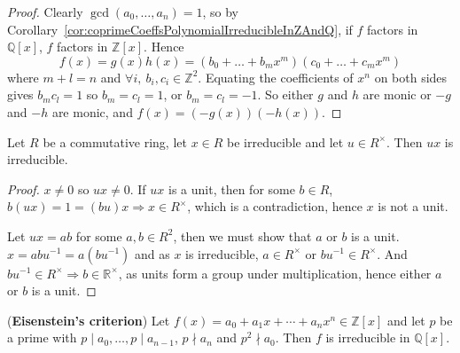 \begin{proof}
	Clearly $\gcd(a_0, \dots, a_n) = 1$, so by Corollary~\ref{cor:coprimeCoeffsPolynomialIrreducibleInZAndQ}, if $f$ factors in $\mathbb{Q}[x]$, $f$ factors in $\mathbb{Z}[x]$. Hence
	\[
		f(x) = g(x) h(x) = (b_0 + \dots + b_m x^m) (c_0 + \dots + c_m x^m)
	\]
	where $m + l = n$ and $\forall i, \ b_i, c_i \in \mathbb{Z}^2$. Equating the coefficients of $x^n$ on both sides gives $b_m c_l = 1$ so $b_m = c_l = 1$, or $b_m = c_l = -1$. So either $g$ and $h$ are monic or $-g$ and $-h$ are monic, and $f(x) = (-g(x)) (-h(x))$.
\end{proof}

\begin{lemma}\label{lem:irreducibleTimesUnitIsIrreducible}
	Let $R$ be a commutative ring, let $x \in R$ be irreducible and let $u \in R^{\times}$. Then $ux$ is irreducible.
\end{lemma}

\begin{proof}
	$x \ne 0$ so $ux \ne 0$. If $ux$ is a unit, then for some $b \in R$, $b (ux) = 1 = (bu) x \Longrightarrow x \in R^{\times}$, which is a contradiction, hence $x$ is not a unit.

	Let $ux = ab$ for some $a, b \in R^2$, then we must show that $a$ or $b$ is a unit. $x = ab u^{-1} = a(b u^{-1})$ and as $x$ is irreducible, $a \in R^{\times}$ or $b u^{-1} \in R^{\times}$. And $b u^{-1} \in R^{\times} \Rightarrow b \in \mathbb{R}^{\times}$, as units form a group under multiplication, hence either $a$ or $b$ is a unit.
\end{proof}

\begin{proposition}
	(\textbf{Eisenstein's criterion}) Let $f(x) = a_0 + a_1 x + \cdots + a_n x^n \in \mathbb{Z}[x]$ and let $p$ be a prime with $p \mid a_0, \dots, p \mid a_{n - 1}$, $p \nmid a_n$ and $p^2 \nmid a_0$. Then $f$ is irreducible in $\mathbb{Q}[x]$.
\end{proposition}

